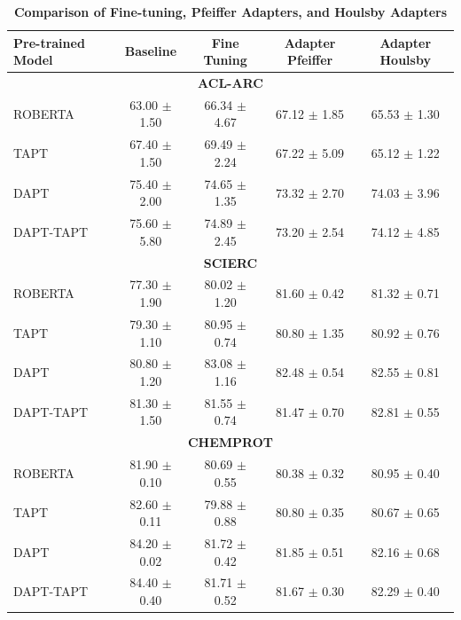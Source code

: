 \documentclass[10pt,twocolumn,letterpaper]{article}
\begin{document}
\begin{table}[h]
\centering

\begin{tabular}{lcccc}
\hline
\textbf{Pre-trained Model} & \textbf{Baseline} & \textbf{Fine Tuning} & \textbf{Adapter Pfeiffer} & \textbf{Adapter Houlsby} \\
\hline
\multicolumn{5}{c}{\textbf{ACL-ARC}} \\
ROBERTA & 63.00 $\pm$ 1.50 & 66.34 $\pm$ 4.67 & 67.12 $\pm$ 1.85 & 65.53 $\pm$ 1.30 \\
TAPT & 67.40 $\pm$ 1.50 & 69.49 $\pm$ 2.24 & 67.22 $\pm$ 5.09 & 65.12 $\pm$ 1.22 \\
DAPT & 75.40 $\pm$ 2.00 & 74.65 $\pm$ 1.35 & 73.32 $\pm$ 2.70 & 74.03 $\pm$ 3.96 \\
DAPT-TAPT & 75.60 $\pm$ 5.80 & 74.89 $\pm$ 2.45 & 73.20 $\pm$ 2.54 & 74.12 $\pm$ 4.85 \\
\hline
\multicolumn{5}{c}{\textbf{SCIERC}} \\
ROBERTA & 77.30 $\pm$ 1.90 & 80.02 $\pm$ 1.20 & 81.60 $\pm$ 0.42 & 81.32 $\pm$ 0.71 \\
TAPT & 79.30 $\pm$ 1.10 & 80.95 $\pm$ 0.74 & 80.80 $\pm$ 1.35 & 80.92 $\pm$ 0.76 \\
DAPT & 80.80 $\pm$ 1.20 & 83.08 $\pm$ 1.16 & 82.48 $\pm$ 0.54 & 82.55 $\pm$ 0.81 \\
DAPT-TAPT & 81.30 $\pm$ 1.50 & 81.55 $\pm$ 0.74 & 81.47 $\pm$ 0.70 & 82.81 $\pm$ 0.55 \\
\hline
\multicolumn{5}{c}{\textbf{CHEMPROT}} \\
ROBERTA & 81.90 $\pm$ 0.10 & 80.69 $\pm$ 0.55 & 80.38 $\pm$ 0.32 & 80.95 $\pm$ 0.40 \\
TAPT & 82.60 $\pm$ 0.11 & 79.88 $\pm$ 0.88 & 80.80 $\pm$ 0.35 & 80.67 $\pm$ 0.65 \\
DAPT & 84.20 $\pm$ 0.02 & 81.72 $\pm$ 0.42 & 81.85 $\pm$ 0.51 & 82.16 $\pm$ 0.68 \\
DAPT-TAPT & 84.40 $\pm$ 0.40 & 81.71 $\pm$ 0.52 & 81.67 $\pm$ 0.30 & 82.29 $\pm$ 0.40 \\
\hline
\end{tabular}
\caption{\textbf{Comparison of Fine-tuning, Pfeiffer Adapters, and Houlsby Adapters}}
\label{tab.adaptersvsftresults}
\end{table}
\end{document}
